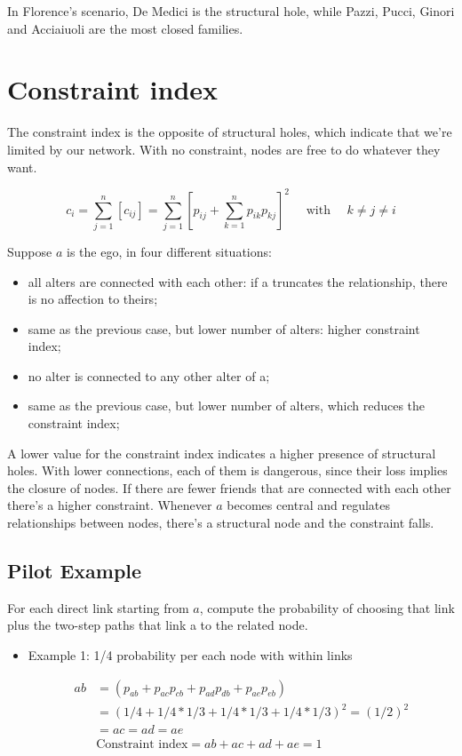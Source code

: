 \documentclass[
  notitlepage,
  onecolumn,
  openany]{book}
\providecommand{\tightlist}{%
  \setlength{\itemsep}{0pt}\setlength{\parskip}{0pt}}
\begin{document}
In Florence's scenario, De Medici is the structural hole, while Pazzi, Pucci, Ginori and Acciaiuoli are the most closed families.

\hypertarget{constraint-index}{%
\section{Constraint index}\label{constraint-index}}

The constraint index is the opposite of structural holes, which indicate that we're limited by our network. With no constraint, nodes are free to do whatever they want.

\[
c_{i}=\sum_{j=1}^{n}\left[c_{i j}\right]=\sum_{j=1}^{n}\left[p_{i j}+\sum_{k=1}^{n} p_{i k} p_{k j}\right]^{2} \quad \text { with } \quad k \neq j \neq i
\]

Suppose \(a\) is the ego, in four different situations:

\begin{itemize}
\tightlist
\item
  all alters are connected with each other: if a truncates the relationship, there is no affection to theirs;
\item
  same as the previous case, but lower number of alters: higher constraint index;
\item
  no alter is connected to any other alter of a;
\item
  same as the previous case, but lower number of alters, which reduces the constraint index;
\end{itemize}

A lower value for the constraint index indicates a higher presence of structural holes. With lower connections, each of them is dangerous, since their loss implies the closure of nodes. If there are fewer friends that are connected with each other there's a higher constraint. Whenever \(a\) becomes central and regulates relationships between nodes, there's a structural node and the constraint falls.

\hypertarget{pilot-example}{%
\subsection{Pilot Example}\label{pilot-example}}

For each direct link starting from \(a\), compute the probability of choosing that link plus the two-step paths that link a to the related node.

\begin{itemize}
\item
  Example 1: 1/4 probability per each node with within links

  \[
    \begin{aligned}
    ab &= (p_{ab}+p_{ac}p_{cb}+p_{ad}p_{db}+p_{ae}p_{eb})
    \\&= (1/4+1/4*1/3+1/4*1/3+1/4*1/3)^2 =(1/2)^2 \\
    & = ac = ad = ae\\
    &\text{Constraint index} = ab+ac+ad+ae = 1
    \end{aligned}
    \]
\end{itemize}
\end{document}

